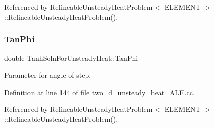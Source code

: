 Referenced by Refineable\+Unsteady\+Heat\+Problem$<$ E\+L\+E\+M\+E\+N\+T $>$\+::\+Refineable\+Unsteady\+Heat\+Problem().

\mbox{\label{namespaceTanhSolnForUnsteadyHeat_af8d2e06630e8a3f71d1f8dbeecf8a964}} 
\subsubsection{\texorpdfstring{Tan\+Phi}{TanPhi}}
{\footnotesize\ttfamily double Tanh\+Soln\+For\+Unsteady\+Heat\+::\+Tan\+Phi}



Parameter for angle of step. 



Definition at line 144 of file two\+\_\+d\+\_\+unsteady\+\_\+heat\+\_\+\+A\+L\+E.\+cc.



Referenced by Refineable\+Unsteady\+Heat\+Problem$<$ E\+L\+E\+M\+E\+N\+T $>$\+::\+Refineable\+Unsteady\+Heat\+Problem().

